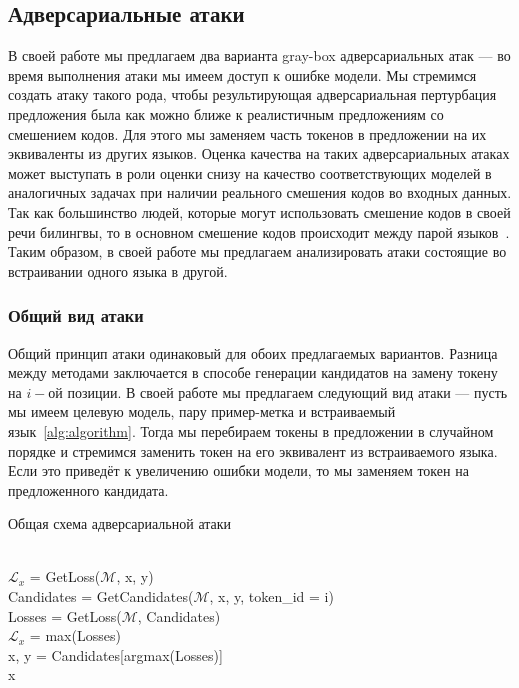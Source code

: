 \subsection{Адверсариальные атаки}
В своей работе мы предлагаем два варианта gray-box адверсариальных атак — во время выполнения атаки мы имеем доступ к ошибке модели.
Мы стремимся создать атаку такого рода, чтобы результирующая адверсариальная пертурбация предложения была как можно ближе к реалистичным предложениям со смешением кодов.
Для этого мы заменяем часть токенов в предложении на их эквиваленты из других языков.
Оценка качества на таких адверсариальных атаках может выступать в роли оценки снизу на качество соответствующих моделей в аналогичных задачах при наличии реального смешения кодов во входных данных. \\
Так как большинство людей, которые могут использовать смешение кодов в своей речи билингвы, то в основном смешение кодов происходит между парой языков~\cite{bilinguals}.
Таким образом, в своей работе мы предлагаем анализировать атаки состоящие во встраивании одного языка в другой.

\subsubsection{Общий вид атаки}
Общий принцип атаки одинаковый для обоих предлагаемых вариантов.
Разница между методами заключается в способе генерации кандидатов на замену токену на $i-$ой позиции.
В своей работе мы предлагаем следующий вид атаки — пусть мы имеем целевую модель, пару пример-метка и встраиваемый язык~\eqref{alg:algorithm}.
Тогда мы перебираем токены в предложении в случайном порядке и стремимся заменить токен на его эквивалент из встраиваемого языка.
Если это приведёт к увеличению ошибки модели, то мы заменяем токен на предложенного кандидата.

\begin{algorithm}
    \caption{Общая схема адверсариальной атаки}
    \begin{algorithmic}
         \\
        $\mathcal{L}_{x}$ = GetLoss($\mathcal{M}$, x, y)
            \\
            \ind Candidates = GetCandidates($\mathcal{M}$, x, y, token\_id = i) \\
            \ind Losses = GetLoss($\mathcal{M}$, Candidates)
            \ind{}
                    \\
                    \ind\ind$\mathcal{L}_{x}$ = max(Losses) \\
                    \ind\ind x, y = Candidates[argmax(Losses)]
            \EndIf
        \EndFor \\
        \ind\Return x
    \end{algorithmic}\label{alg:algorithm}
\end{algorithm}

